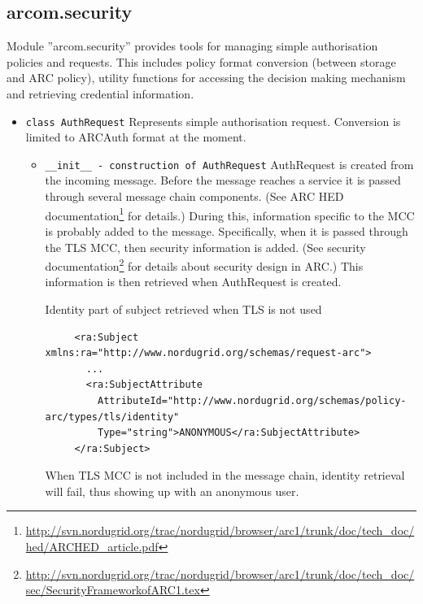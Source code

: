 \documentclass{article}
\begin{document}
\subsection{arcom.security}
\label{asecurity}
Module ''arcom.security'' provides tools for managing simple authorisation policies and requests.
This includes policy format conversion (between storage and ARC policy), utility functions 
for accessing the decision making mechanism and retrieving credential information.
\begin{flushleft}

\begin{itemize}
  \item{ \verb$class AuthRequest$\newline
  Represents simple authorisation request.
  Conversion is limited to ARCAuth format at the moment.
  \begin{itemize}
    \item{ \verb$__init__ - construction of AuthRequest$\newline
      AuthRequest is created from the incoming message.
      Before the message reaches a service it is passed through several message chain components.
      (See ARC HED documentation\footnote{\url{http://svn.nordugrid.org/trac/nordugrid/browser/arc1/trunk/doc/tech\_doc/hed/ARCHED\_article.pdf}} for details.)
      During this, information specific to the MCC is probably added to the message.
      Specifically, when it is passed through the TLS MCC, then security information is added.
      (See security documentation\footnote{\url{http://svn.nordugrid.org/trac/nordugrid/browser/arc1/trunk/doc/tech\_doc/sec/SecurityFrameworkofARC1.tex}} 
       for details about security design in ARC.)
      This information is then retrieved when AuthRequest is created.
      \begin{example}
        \caption{Identity part of subject retrieved when TLS is not used}\label{asubnotls}
\begin{verbatim}
     <ra:Subject xmlns:ra="http://www.nordugrid.org/schemas/request-arc">
       ...
       <ra:SubjectAttribute 
         AttributeId="http://www.nordugrid.org/schemas/policy-arc/types/tls/identity" 
         Type="string">ANONYMOUS</ra:SubjectAttribute>
     </ra:Subject>
\end{verbatim}
        When TLS MCC is not included in the message chain, identity retrieval will fail,
        thus showing up with an anonymous user.
      \end{example}
    }
  \end{itemize}
}
\end{itemize}
\end{flushleft}
\end{document}

